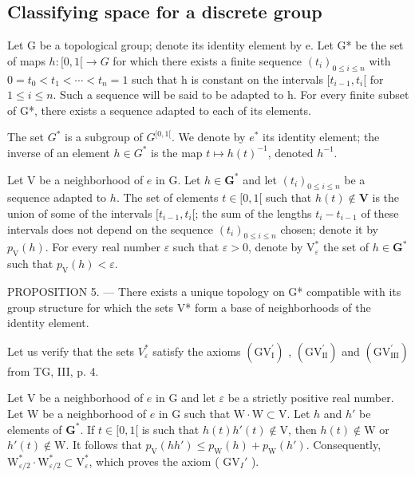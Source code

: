 \subsection{Classifying space for a discrete group}

Let G be a topological group; denote its identity element by e. Let G* be the set of maps \(h\colon[0,1[ \to G\) for which there exists a finite sequence \((t_{i})_{0\leqslant i\leqslant n}\) with \(0=t_{0}<t_{1}<\cdots<t_{n}=1\) such that h is constant on the intervals \([t_{i-1},t_{i}[\) for \(1\leqslant i\leqslant n\). Such a sequence will be said to be adapted to h. For every finite subset of G*, there exists a sequence adapted to each of its elements.

The set \(G^{*}\) is a subgroup of \(G^{[0,1[}\). We denote by \(e^{*}\) its identity element; the inverse of an element \(h \in G^{*}\) is the map \(t \mapsto h(t)^{-1}\), denoted \(h^{-1}\).

Let V be a neighborhood of \(e\) in G. Let \(h \in \mathbf{G}^*\) and let \((t_i)_{0 \leqslant i \leqslant n}\) be a sequence adapted to \(h\). The set of elements \(t \in [0,1[\) such that \(h(t) \notin \mathbf{V}\) is the union of some of the intervals \([t_{i-1}, t_i[\); the sum of the lengths \(t_i - t_{i-1}\) of these intervals does not depend on the sequence \((t_i)_{0 \leqslant i \leqslant n}\) chosen; denote it by \(p_{\mathrm{V}}(h)\). For every real number \(\varepsilon\) such that \(\varepsilon > 0\), denote by \(\mathrm{V}_{\varepsilon}^*\) the set of \(h \in \mathbf{G}^*\) such that \(p_{\mathrm{V}}(h) < \varepsilon\).

PROPOSITION 5. --- There exists a unique topology on G* compatible with its group structure for which the sets V* form a base of neighborhoods of the identity element.

Let us verify that the sets \(V_{\varepsilon}^{*}\) satisfy the axioms \((\mathrm{GV}_{\mathrm{I}}^{\prime})\) , \((\mathrm{GV}_{\mathrm{II}}^{\prime})\) and \((\mathrm{GV}_{\mathrm{III}}^{\prime})\) from TG, III, p. 4.

Let V be a neighborhood of \(e\) in G and let \(\varepsilon\) be a strictly positive real number. Let W be a neighborhood of \(e\) in G such that \(\mathrm{W} \cdot \mathrm{W} \subset \mathrm{V}\). Let \(h\) and \(h'\) be elements of \(\mathbf{G}^*\). If \(t \in [0,1[\) is such that \(h(t)h'(t) \notin \mathrm{V}\), then \(h(t) \notin \mathrm{W}\) or \(h'(t) \notin \mathrm{W}\). It follows that \(p_{\mathrm{V}}(hh') \leqslant p_{\mathrm{W}}(h) + p_{\mathrm{W}}(h')\). Consequently, \(\mathrm{W}_{\varepsilon/2}^* \cdot \mathrm{W}_{\varepsilon/2}^* \subset \mathrm{V}_{\varepsilon}^*\), which proves the axiom ( \(\mathrm{GV}_I'\) ).

